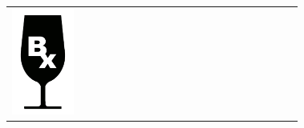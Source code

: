 {\begin{center}
\begin{tabular}{ >{\centering\arraybackslash}p{0.18\linewidth}  >{\centering\arraybackslash}p{0.18\linewidth}  >{\centering\arraybackslash}p{0.18\linewidth}  >{\centering\arraybackslash}p{0.18\linewidth}}
\includegraphics[scale=0.021, trim= 0em -5em -5em -5em,]{Icones/icon_bordeaux_black.pdf}
&

\end{tabular}
\end{center}}
